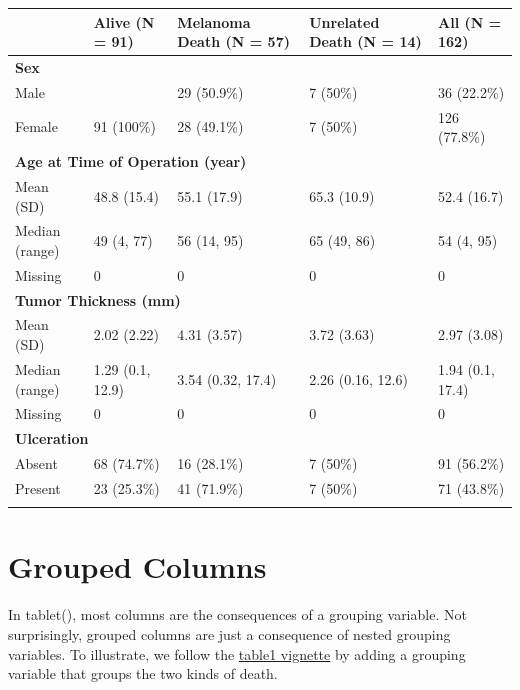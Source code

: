 \documentclass[
]{article}
\begin{document}
\begin{table}[ht]
\centering
\begin{tabular}{lllll}
  \toprule
  & Alive
(N = 91) & Melanoma Death
(N = 57) & Unrelated Death
(N = 14) & All
(N = 162) \\ 
  \midrule
\multicolumn{5}{l}{\!\!\textbf{Sex}}\\
Male &  & 29 (50.9\%) & 7 (50\%) & 36 (22.2\%) \\ 
  Female & 91 (100\%) & 28 (49.1\%) & 7 (50\%) & 126 (77.8\%) \\ 
   \midrule
\multicolumn{5}{l}{\!\!\textbf{Age at Time of Operation (year)}}\\
Mean (SD) & 48.8 (15.4) & 55.1 (17.9) & 65.3 (10.9) & 52.4 (16.7) \\ 
  Median (range) & 49 (4, 77) & 56 (14, 95) & 65 (49, 86) & 54 (4, 95) \\ 
  Missing & 0 & 0 & 0 & 0 \\ 
   \midrule
\multicolumn{5}{l}{\!\!\textbf{Tumor Thickness (mm)}}\\
Mean (SD) & 2.02 (2.22) & 4.31 (3.57) & 3.72 (3.63) & 2.97 (3.08) \\ 
  Median (range) & 1.29 (0.1, 12.9) & 3.54 (0.32, 17.4) & 2.26 (0.16, 12.6) & 1.94 (0.1, 17.4) \\ 
  Missing & 0 & 0 & 0 & 0 \\ 
   \midrule
\multicolumn{5}{l}{\!\!\textbf{Ulceration}}\\
Absent & 68 (74.7\%) & 16 (28.1\%) & 7 (50\%) & 91 (56.2\%) \\ 
  Present & 23 (25.3\%) & 41 (71.9\%) & 7 (50\%) & 71 (43.8\%) \\ 
   \bottomrule
\multicolumn{5}{l}{}\\
\end{tabular}
\end{table}

\section{Grouped Columns}\label{grouped-columns}

In tablet(), most columns are the consequences of a grouping variable.
Not surprisingly, grouped columns are just a consequence of nested
grouping variables. To illustrate, we follow the
\href{https://CRAN.R-project.org/package=table1}{table1 vignette} by
adding a grouping variable that groups the two kinds of death.
\end{document}
